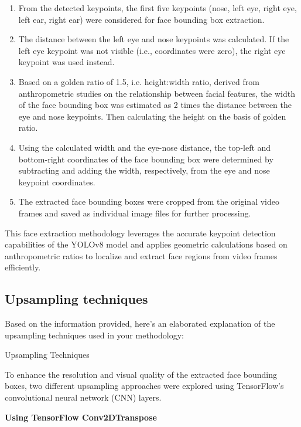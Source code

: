 \begin{enumerate}
    \item From the detected keypoints, the first five keypoints (nose, left eye, right eye, left ear, right ear) were considered for face bounding box extraction.
    \item The distance between the left eye and nose keypoints was calculated. If the left eye keypoint was not visible (i.e., coordinates were zero), the right eye keypoint was used instead.
    \item Based on a golden ratio of 1.5, i.e. height:width ratio, derived from anthropometric studies on the relationship between facial features, the width of the face bounding box was estimated as 2 times the distance between the eye and nose keypoints. Then calculating the height on the basis of golden ratio.
    \item Using the calculated width and the eye-nose distance, the top-left and bottom-right coordinates of the face bounding box were determined by subtracting and adding the width, respectively, from the eye and nose keypoint coordinates.
    \item The extracted face bounding boxes were cropped from the original video frames and saved as individual image files for further processing.
\end{enumerate}

This face extraction methodology leverages the accurate keypoint detection capabilities of the YOLOv8 model and applies geometric calculations based on anthropometric ratios to localize and extract face regions from video frames efficiently.

\subsection{Upsampling techniques}

Based on the information provided, here's an elaborated explanation of the upsampling techniques used in your methodology:

Upsampling Techniques

To enhance the resolution and visual quality of the extracted face bounding boxes, two different upsampling approaches were explored using TensorFlow's convolutional neural network (CNN) layers.

\textbf{Using TensorFlow Conv2DTranspose}

